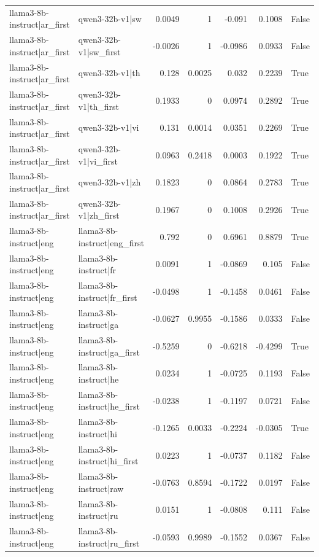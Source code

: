 \begin{table}
\begin{tabular}{l l r r r r l}
llama3-8b-instruct|ar_first & qwen3-32b-v1|sw & 0.0049 & 1 & -0.091 & 0.1008 & False \\
llama3-8b-instruct|ar_first & qwen3-32b-v1|sw_first & -0.0026 & 1 & -0.0986 & 0.0933 & False \\
llama3-8b-instruct|ar_first & qwen3-32b-v1|th & 0.128 & 0.0025 & 0.032 & 0.2239 & True \\
llama3-8b-instruct|ar_first & qwen3-32b-v1|th_first & 0.1933 & 0 & 0.0974 & 0.2892 & True \\
llama3-8b-instruct|ar_first & qwen3-32b-v1|vi & 0.131 & 0.0014 & 0.0351 & 0.2269 & True \\
llama3-8b-instruct|ar_first & qwen3-32b-v1|vi_first & 0.0963 & 0.2418 & 0.0003 & 0.1922 & True \\
llama3-8b-instruct|ar_first & qwen3-32b-v1|zh & 0.1823 & 0 & 0.0864 & 0.2783 & True \\
llama3-8b-instruct|ar_first & qwen3-32b-v1|zh_first & 0.1967 & 0 & 0.1008 & 0.2926 & True \\
llama3-8b-instruct|eng & llama3-8b-instruct|eng_first & 0.792 & 0 & 0.6961 & 0.8879 & True \\
llama3-8b-instruct|eng & llama3-8b-instruct|fr & 0.0091 & 1 & -0.0869 & 0.105 & False \\
llama3-8b-instruct|eng & llama3-8b-instruct|fr_first & -0.0498 & 1 & -0.1458 & 0.0461 & False \\
llama3-8b-instruct|eng & llama3-8b-instruct|ga & -0.0627 & 0.9955 & -0.1586 & 0.0333 & False \\
llama3-8b-instruct|eng & llama3-8b-instruct|ga_first & -0.5259 & 0 & -0.6218 & -0.4299 & True \\
llama3-8b-instruct|eng & llama3-8b-instruct|he & 0.0234 & 1 & -0.0725 & 0.1193 & False \\
llama3-8b-instruct|eng & llama3-8b-instruct|he_first & -0.0238 & 1 & -0.1197 & 0.0721 & False \\
llama3-8b-instruct|eng & llama3-8b-instruct|hi & -0.1265 & 0.0033 & -0.2224 & -0.0305 & True \\
llama3-8b-instruct|eng & llama3-8b-instruct|hi_first & 0.0223 & 1 & -0.0737 & 0.1182 & False \\
llama3-8b-instruct|eng & llama3-8b-instruct|raw & -0.0763 & 0.8594 & -0.1722 & 0.0197 & False \\
llama3-8b-instruct|eng & llama3-8b-instruct|ru & 0.0151 & 1 & -0.0808 & 0.111 & False \\
llama3-8b-instruct|eng & llama3-8b-instruct|ru_first & -0.0593 & 0.9989 & -0.1552 & 0.0367 & False \\

\end{tabular}
\end{table}
